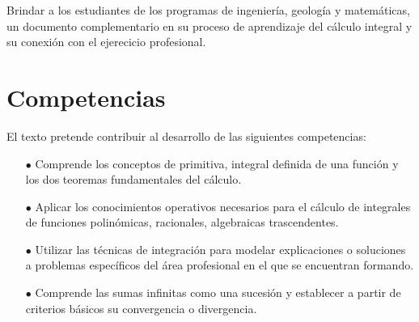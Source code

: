 Brindar a los estudiantes de los programas de ingeniería, geología y matemáticas, un documento complementario en su proceso de aprendizaje del c\'alculo integral y su conexi\'on con el ejerecicio profesional.

\section*{Competencias}

El texto pretende contribuir al desarrollo de las siguientes competencias:

\begin{enumerate}

\item[$\bullet$] Comprende los conceptos de primitiva, integral definida de una funci\'on y los dos teoremas fundamentales del c\'alculo.

\item[$\bullet$] Aplicar los conocimientos operativos necesarios para el c\'alculo de integrales de funciones polin\'omicas, racionales, algebraicas trascendentes.

\item[$\bullet$] Utilizar las t\'ecnicas de integraci\'on para modelar explicaciones o soluciones a problemas espec\'ificos del \'area profesional en el que se encuentran formando.

\item[$\bullet$] Comprende  las sumas infinitas como una sucesión y establecer a partir de criterios básicos su convergencia o divergencia.

\end{enumerate}



%









